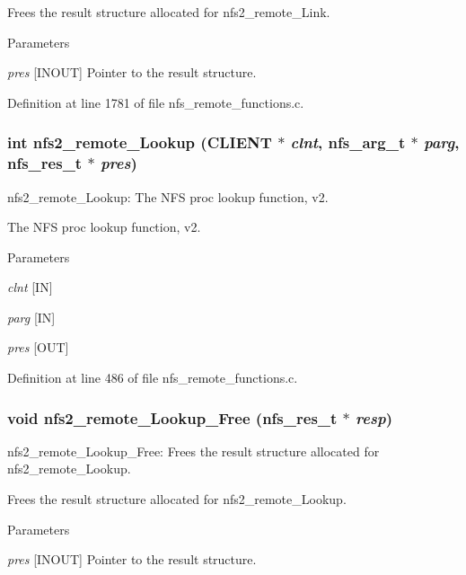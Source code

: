 Frees the result structure allocated for nfs2\_\-remote\_\-Link.


\begin{DoxyParams}{Parameters}
\item[{\em pres}][INOUT] Pointer to the result structure. \end{DoxyParams}


Definition at line 1781 of file nfs\_\-remote\_\-functions.c.
\subsubsection[{nfs2\_\-remote\_\-Lookup}]{\setlength{\rightskip}{0pt plus 5cm}int nfs2\_\-remote\_\-Lookup (CLIENT $\ast$ {\em clnt}, \/  nfs\_\-arg\_\-t $\ast$ {\em parg}, \/  nfs\_\-res\_\-t $\ast$ {\em pres})}\label{group__NFSprocs_gab69abd3b6ba8d45a90feaeb7c5792381}
nfs2\_\-remote\_\-Lookup: The NFS proc lookup function, v2.

The NFS proc lookup function, v2.


\begin{DoxyParams}{Parameters}
\item[{\em clnt}][IN] \item[{\em parg}][IN] \item[{\em pres}][OUT] \end{DoxyParams}


Definition at line 486 of file nfs\_\-remote\_\-functions.c.
\subsubsection[{nfs2\_\-remote\_\-Lookup\_\-Free}]{\setlength{\rightskip}{0pt plus 5cm}void nfs2\_\-remote\_\-Lookup\_\-Free (nfs\_\-res\_\-t $\ast$ {\em resp})}\label{group__NFSprocs_ga5c00238539fa4623b77297d794037292}
nfs2\_\-remote\_\-Lookup\_\-Free: Frees the result structure allocated for nfs2\_\-remote\_\-Lookup.

Frees the result structure allocated for nfs2\_\-remote\_\-Lookup.


\begin{DoxyParams}{Parameters}
\item[{\em pres}][INOUT] Pointer to the result structure. \end{DoxyParams}


